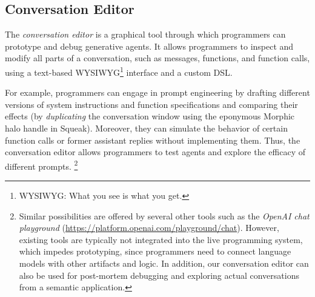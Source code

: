 \subsection*{Conversation Editor}
\label{sec:semtex/tools/editor}

The \emph{conversation editor} is a graphical tool through which programmers can prototype and debug generative agents.
It allows programmers to inspect and modify all parts of a conversation, such as messages, functions, and function calls, using a text-based WYSIWYG\footnote{WYSIWYG: What you see is what you get.} interface and a custom DSL.

\FloatBarrier

For example, programmers can engage in prompt engineering by drafting different versions of system instructions and function specifications and comparing their effects (by \emph{duplicating} the conversation window using the eponymous Morphic halo handle in Squeak).
Moreover, they can simulate the behavior of certain function calls or former assistant replies without implementing them.
Thus, the conversation editor allows programmers to test agents and explore the efficacy of different prompts.%
\footnote{
	Similar possibilities are offered by several other tools such as the \emph{OpenAI chat playground} (\url{https://platform.openai.com/playground/chat}).
	However, existing tools are typically not integrated into the live programming system, which impedes prototyping, since programmers need to connect language models with other artifacts and logic.
	In addition, our conversation editor can also be used for post-mortem debugging and exploring actual conversations from a semantic application.
}

